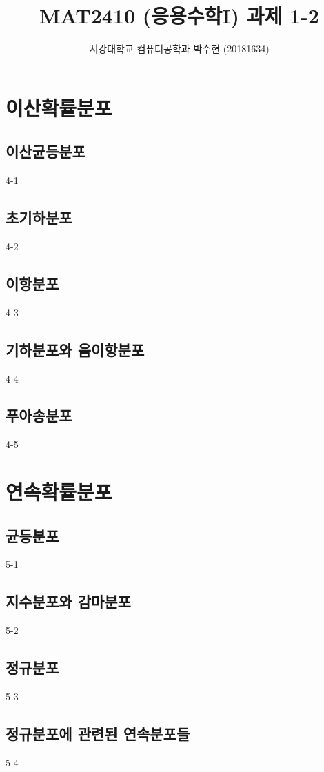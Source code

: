 



\title{MAT2410 (응용수학I) \space \newline 과제 1-2}
\author{서강대학교 컴퓨터공학과 박수현 (20181634)}
\maketitle

\setcounter{section}{3}

\section{이산확률분포}
\setcounter{subsection}{0}

\subsection{이산균등분포}
{4-1}

\newpage
\subsection{초기하분포}
{4-2}

\newpage
\subsection{이항분포}
{4-3}

\newpage
\subsection{기하분포와 음이항분포}
{4-4}

\newpage
\subsection{푸아송분포}
{4-5}

\newpage
\section{연속확률분포}
\setcounter{subsection}{0}

\subsection{균등분포}
{5-1}

\newpage
\subsection{지수분포와 감마분포}
{5-2}

\newpage
\subsection{정규분포}
{5-3}

\newpage
\subsection{정규분포에 관련된 연속분포들}
{5-4}

